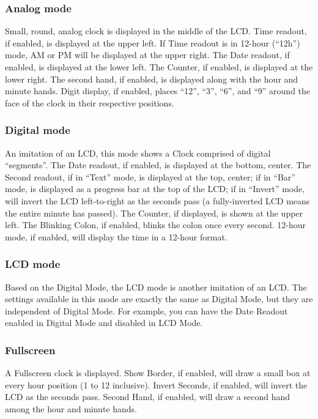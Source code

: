 \subsubsection{Analog mode}
Small, round, analog clock is displayed in the middle of the LCD.
Time readout, if enabled, is displayed at the upper left.
If Time readout is in 12-hour (``12h'') mode, AM or PM will be displayed at the
upper right.  The Date readout, if enabled, is displayed at the lower left.
The Counter, if enabled, is displayed at the lower right.
The second hand, if enabled, is displayed along with the hour and minute hands.
Digit display, if enabled, places ``12'', ``3'', ``6'', and ``9'' around the
face of the clock in their respective positions. 

\subsubsection{Digital mode}
An imitation of an LCD, this mode shows a Clock comprised of digital ``segments''.
The Date readout, if enabled, is displayed at the bottom, center.
The Second readout, if in ``Text'' mode, is displayed at the top, center; if in
``Bar'' mode, is displayed as a progress bar at the top of the LCD; if in
``Invert'' mode, will invert the LCD left-to-right as the seconds pass (a
fully-inverted LCD means the entire minute has passed).
The Counter, if displayed, is shown at the upper left.
The Blinking Colon, if enabled, blinks the colon once every second.
12-hour mode, if enabled, will display the time in a 12-hour format.

\subsubsection{LCD mode}
Based on the Digital Mode, the LCD mode is another imitation of an LCD.
The settings available in this mode are exactly the same as Digital Mode, but
they are independent of Digital Mode. For example, you can have the Date
Readout enabled in Digital Mode and disabled in LCD Mode.

\subsubsection{Fullscreen}
A Fullscreen clock is displayed. Show Border, if enabled, will draw a small
box at every hour position (1 to 12 inclusive).
Invert Seconds, if enabled, will invert the LCD as the seconds pass.
Second Hand, if enabled, will draw a second hand among the hour and minute hands.

